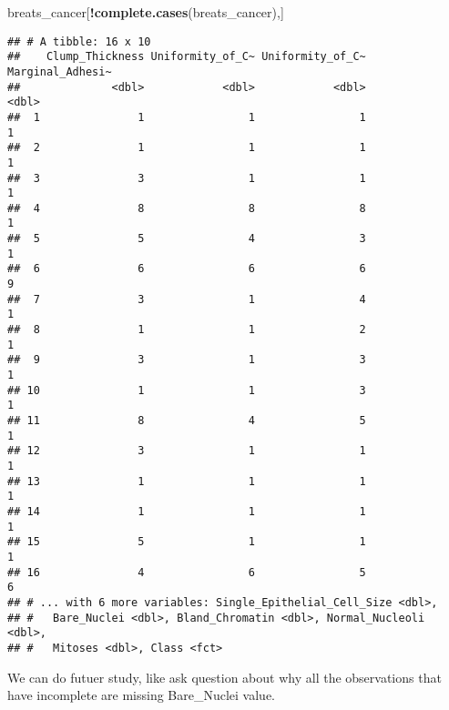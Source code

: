 \documentclass[]{article}
\newenvironment{Shaded}{\begin{snugshade}}{\end{snugshade}}
\newcommand{\KeywordTok}[1]{\textcolor[rgb]{0.13,0.29,0.53}{\textbf{#1}}}
\newcommand{\NormalTok}[1]{#1}
\newcommand{\OperatorTok}[1]{\textcolor[rgb]{0.81,0.36,0.00}{\textbf{#1}}}
\newcommand{\StringTok}[1]{\textcolor[rgb]{0.31,0.60,0.02}{#1}}
\begin{document}
\begin{Shaded}
\begin{Highlighting}[]
\NormalTok{breats_cancer[}\OperatorTok{!}\KeywordTok{complete.cases}\NormalTok{(breats_cancer),]}
\end{Highlighting}
\end{Shaded}

\begin{verbatim}
## # A tibble: 16 x 10
##    Clump_Thickness Uniformity_of_C~ Uniformity_of_C~ Marginal_Adhesi~
##              <dbl>            <dbl>            <dbl>            <dbl>
##  1               1                1                1                1
##  2               1                1                1                1
##  3               3                1                1                1
##  4               8                8                8                1
##  5               5                4                3                1
##  6               6                6                6                9
##  7               3                1                4                1
##  8               1                1                2                1
##  9               3                1                3                1
## 10               1                1                3                1
## 11               8                4                5                1
## 12               3                1                1                1
## 13               1                1                1                1
## 14               1                1                1                1
## 15               5                1                1                1
## 16               4                6                5                6
## # ... with 6 more variables: Single_Epithelial_Cell_Size <dbl>,
## #   Bare_Nuclei <dbl>, Bland_Chromatin <dbl>, Normal_Nucleoli <dbl>,
## #   Mitoses <dbl>, Class <fct>
\end{verbatim}

\begin{Shaded}
\end{Shaded}

We can do futuer study, like ask question about why all the observations
that have incomplete are missing Bare\_Nuclei value.
\end{document}
